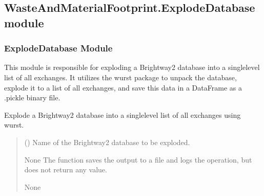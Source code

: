 \documentclass[letterpaper,10pt,english]{sphinxmanual}
\begin{document}
\subsection{WasteAndMaterialFootprint.ExplodeDatabase module}
\label{\detokenize{WasteAndMaterialFootprint:module-WasteAndMaterialFootprint.ExplodeDatabase}}\label{\detokenize{WasteAndMaterialFootprint:wasteandmaterialfootprint-explodedatabase-module}}

\subsubsection{ExplodeDatabase Module}
\label{\detokenize{WasteAndMaterialFootprint:explodedatabase-module}}
\sphinxAtStartPar
This module is responsible for exploding a Brightway2 database into a single\sphinxhyphen{}level list of all exchanges.
It utilizes the wurst package to unpack the database, explode it to a list of all exchanges, and save this data 
in a DataFrame as a .pickle binary file.

\begin{fulllineitems}
\label{\detokenize{WasteAndMaterialFootprint:WasteAndMaterialFootprint.ExplodeDatabase.ExplodeDatabase}}
\pysigstartsignatures
{}
\pysigstopsignatures
\sphinxAtStartPar
Explode a Brightway2 database into a single\sphinxhyphen{}level list of all exchanges using wurst.
\begin{quote}\begin{description}
\sphinxAtStartPar
{} () \textendash{} Name of the Brightway2 database to be exploded.

\sphinxAtStartPar
None
The function saves the output to a file and logs the operation, but does not return any value.

\sphinxAtStartPar
None

\end{description}\end{quote}

\end{fulllineitems}
\end{document}
